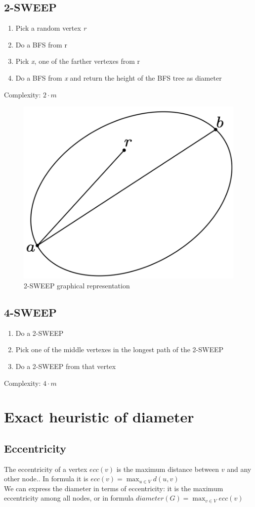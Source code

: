 \subsection{2-SWEEP}
\begin{enumerate}
	\item Pick a random vertex \textit{r}
	\item Do a BFS from r
	\item Pick \textit{x}, one of the farther vertexes from r
	\item Do a BFS from \textit{x} and return the height of the BFS tree as diameter
\end{enumerate}
Complexity: $ 2 \cdot m $

\begin{figure}[H]
	\includegraphics[width=0.4\linewidth]{img/2sweep}
	\caption{2-SWEEP graphical representation}
	\label{fig:2sweep}
\end{figure}
\subsection{4-SWEEP}
\begin{enumerate}
	\item Do a 2-SWEEP
	\item Pick one of the middle vertexes in the longest path of the 2-SWEEP
	\item Do a 2-SWEEP from that vertex
\end{enumerate}
Complexity: $ 4 \cdot m $
\section{Exact heuristic of diameter}
\subsection{Eccentricity}
The eccentricity of a vertex $ ecc(v) $ is the maximum distance between $ v $ and any other node.. In formula it is $ecc(v) = \max_{u\in V}d(u,v) $\\
We can express the diameter in terms of eccentricity: it is the maximum eccentricity among all nodes, or in formula $diameter(G) =  \max_{v \in V}ecc(v) $ 
